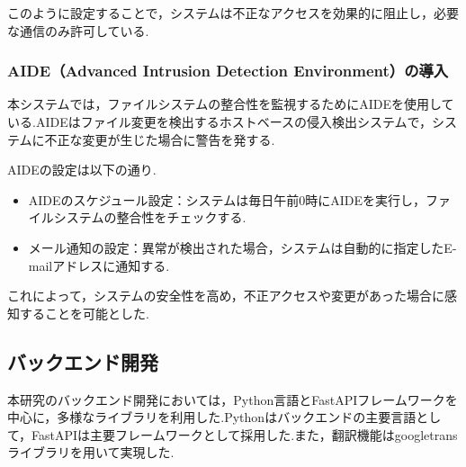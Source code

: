 \documentclass[b5paper,12pt,dvipdfmx]{jsreport}
\begin{document}
このように設定することで，システムは不正なアクセスを効果的に阻止し，必要な通信のみ許可している.


\subsubsection{AIDE（Advanced Intrusion Detection Environment）の導入}
本システムでは，ファイルシステムの整合性を監視するためにAIDEを使用している.AIDEはファイル変更を検出するホストベースの侵入検出システムで，システムに不正な変更が生じた場合に警告を発する.

AIDEの設定は以下の通り.
\begin{itemize}
    \item AIDEのスケジュール設定：システムは毎日午前0時にAIDEを実行し，ファイルシステムの整合性をチェックする.
    \item メール通知の設定：異常が検出された場合，システムは自動的に指定したE-mailアドレスに通知する.
\end{itemize}
これによって，システムの安全性を高め，不正アクセスや変更があった場合に感知することを可能とした.


\subsection{バックエンド開発}
本研究のバックエンド開発においては，Python言語とFastAPIフレームワークを中心に，多様なライブラリを利用した.Pythonはバックエンドの主要言語として，FastAPIは主要フレームワークとして採用した.また，翻訳機能はgoogletransライブラリを用いて実現した.
\end{document}
